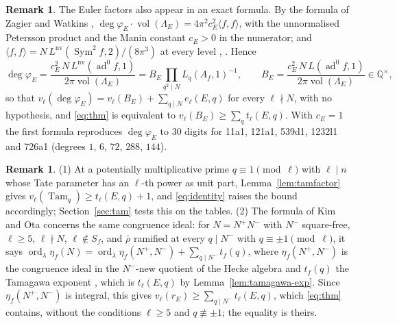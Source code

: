 \documentclass[11pt]{amsart}
\theoremstyle{definition}
\newtheorem{remark}[theorem]{Remark}
\newcommand{\Q}{\mathbb{Q}}
\newcommand{\degphi}{\deg\varphi_E}
\newcommand{\ord}{\operatorname{ord}}
\newcommand{\ad}{\operatorname{ad}^0}
\newcommand{\Sym}{\operatorname{Sym}^2}
\newcommand{\nv}{\mathrm{nv}}
\newcommand{\Tam}{\operatorname{Tam}}
\begin{document}
\begin{remark}\label{rem:degree}
The Euler factors also appear in an exact formula. By the formula of Zagier and Watkins \cite{Zagier85,Watkins02}, $\degphi\cdot\operatorname{vol}(\Lambda_E)=4\pi^2c_E^2\langle f,f\rangle$, with the unnormalised Petersson product and the Manin constant $c_E>0$ in the numerator; and $\langle f,f\rangle=N\,L^{\nv}(\Sym f,2)/(8\pi^3)$ at every level \cite{Rankin39,Shimura76}, \cite[Lemma 2.12]{DFG04}. Hence
\[
\degphi=\frac{c_E^2\,N\,L^{\nv}(\ad f,1)}{2\pi\operatorname{vol}(\Lambda_E)}=B_E\prod_{q^2\mid N}L_q(A_f,1)^{-1},\qquad B_E=\frac{c_E^2\,N\,L(\ad f,1)}{2\pi\operatorname{vol}(\Lambda_E)}\in\Q^\times,
\]
so that $v_\ell(\degphi)=v_\ell(B_E)+\sum_{q\mid N}e_\ell(E,q)$ for every $\ell\nmid N$, with no hypothesis, and \eqref{eq:thm} is equivalent to $v_\ell(B_E)\ge\sum_qt_\ell(E,q)$. With $c_E=1$ the first formula reproduces $\degphi$ to $30$ digits for 11a1, 121a1, 539d1, 1232l1 and 726a1 (degrees $1$, $6$, $72$, $288$, $144$).
\end{remark}

\begin{remark}\label{rem:ko}
(1) At a potentially multiplicative prime $q\equiv1\pmod\ell$ with $\ell\mid n$ whose Tate parameter has an $\ell$-th power as unit part, Lemma~\ref{lem:tamfactor} gives $v_\ell(\Tam_q)\ge t_\ell(E,q)+1$, and \eqref{eq:identity} raises the bound accordingly; Section~\ref{sec:tam} tests this on the tables. (2) The formula of Kim and Ota \cite[Theorem 1.1]{KimOta} concerns the same congruence ideal: for $N=N^+N^-$ with $N^-$ square-free, $\ell\ge5$, $\ell\nmid N$, $\ell\notin S_f$, and $\bar\rho$ ramified at every $q\mid N^-$ with $q\equiv\pm1\pmod\ell$, it says $\ord_\lambda\eta_f(N)=\ord_\lambda\eta_f(N^+,N^-)+\sum_{q\mid N^-}t_f(q)$, where $\eta_f(N^+,N^-)$ is the congruence ideal in the $N^-$-new quotient of the Hecke algebra and $t_f(q)$ the Tamagawa exponent \cite[Definition 2.12]{KimOta}, which is $t_\ell(E,q)$ by Lemma~\ref{lem:tamagawa-exp}. Since $\eta_f(N^+,N^-)$ is integral, this gives $v_\ell(r_E)\ge\sum_{q\mid N^-}t_\ell(E,q)$, which \eqref{eq:thm} contains, without the conditions $\ell\ge5$ and $q\not\equiv\pm1$; the equality is theirs.
\end{remark}
\end{document}
